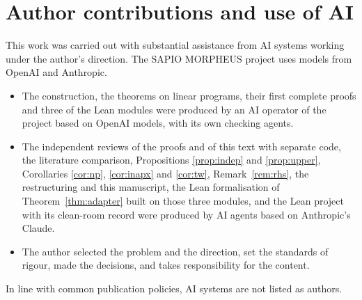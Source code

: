 \documentclass[11pt]{amsart}
\theoremstyle{plain}
\theoremstyle{definition}
\theoremstyle{remark}
\begin{document}
\section*{Author contributions and use of AI}
This work was carried out with substantial assistance from AI systems working under the author's direction. The
SAPIO MORPHEUS project uses models from OpenAI and Anthropic.
\begin{itemize}
\item The construction, the theorems on linear programs, their first complete proofs and three of the Lean modules
  were produced by an AI operator of the project based on OpenAI models, with its own checking agents.
\item The independent reviews of the proofs and of this text with separate code, the literature comparison,
  Propositions \ref{prop:indep} and \ref{prop:upper}, Corollaries \ref{cor:np}, \ref{cor:inapx} and
  \ref{cor:tw}, Remark~\ref{rem:rhs}, the restructuring and this manuscript, the Lean formalisation of
  Theorem~\ref{thm:adapter} built on those three modules, and the Lean project with its clean-room record
  were produced by AI agents based on Anthropic's Claude.
\item The author selected the problem and the direction, set the standards of rigour, made the decisions, and takes
  responsibility for the content.
\end{itemize}
In line with common publication policies, AI systems are not listed as authors.
\end{document}
